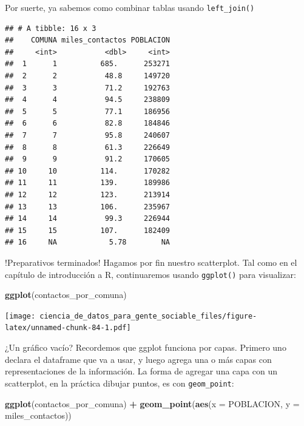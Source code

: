 \documentclass[spanish,]{book}
\newenvironment{Shaded}{\begin{snugshade}}{\end{snugshade}}
\newcommand{\DataTypeTok}[1]{\textcolor[rgb]{0.13,0.29,0.53}{#1}}
\newcommand{\KeywordTok}[1]{\textcolor[rgb]{0.13,0.29,0.53}{\textbf{#1}}}
\newcommand{\NormalTok}[1]{#1}
\newcommand{\OperatorTok}[1]{\textcolor[rgb]{0.81,0.36,0.00}{\textbf{#1}}}
\newcommand{\StringTok}[1]{\textcolor[rgb]{0.31,0.60,0.02}{#1}}
\begin{document}
Por suerte, ya sabemos como combinar tablas usando \texttt{left\_join()}

\begin{Shaded}
\end{Shaded}

\begin{verbatim}
## # A tibble: 16 x 3
##    COMUNA miles_contactos POBLACION
##     <int>           <dbl>     <int>
##  1      1          685.      253271
##  2      2           48.8     149720
##  3      3           71.2     192763
##  4      4           94.5     238809
##  5      5           77.1     186956
##  6      6           82.8     184846
##  7      7           95.8     240607
##  8      8           61.3     226649
##  9      9           91.2     170605
## 10     10          114.      170282
## 11     11          139.      189986
## 12     12          123.      213914
## 13     13          106.      235967
## 14     14           99.3     226944
## 15     15          107.      182409
## 16     NA            5.78        NA
\end{verbatim}

!Preparativos terminados! Hagamos por fin nuestro scatterplot. Tal como en el capítulo de introducción a R, continuaremos usando \texttt{ggplot()} para visualizar:

\begin{Shaded}
\begin{Highlighting}[]
\KeywordTok{ggplot}\NormalTok{(contactos_por_comuna)}
\end{Highlighting}
\end{Shaded}

\texttt{[image: ciencia\_de\_datos\_para\_gente\_sociable\_files/figure-latex/unnamed-chunk-84-1.pdf]}

¿Un gráfico vacío? Recordemos que ggplot funciona por capas. Primero uno declara el dataframe que va a usar, y luego agrega una o más capas con representaciones de la información. La forma de agregar una capa con un scatterplot, en la práctica dibujar puntos, es con \texttt{geom\_point}:

\begin{Shaded}
\begin{Highlighting}[]
\KeywordTok{ggplot}\NormalTok{(contactos_por_comuna) }\OperatorTok{+}\StringTok{ }\KeywordTok{geom_point}\NormalTok{(}\KeywordTok{aes}\NormalTok{(}\DataTypeTok{x =}\NormalTok{ POBLACION, }\DataTypeTok{y =}\NormalTok{ miles_contactos))}
\end{Highlighting}
\end{Shaded}
\end{document}

